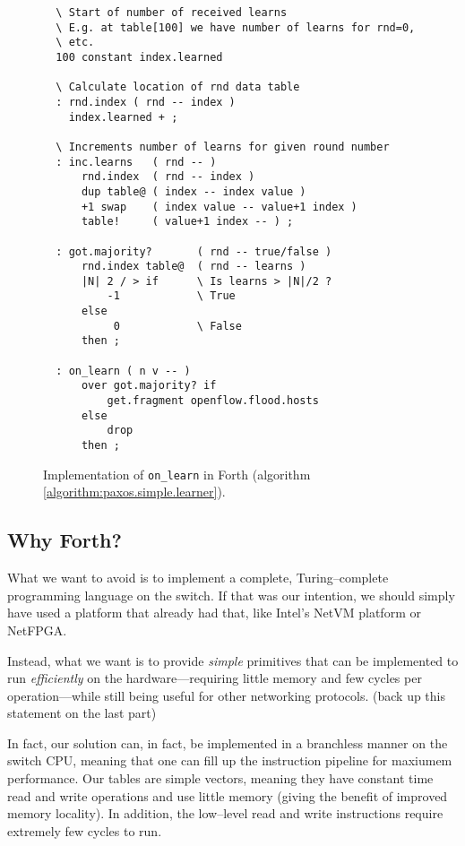 \begin{figure}[H]
  \centering
  \begin{Verbatim}
  \ Start of number of received learns
  \ E.g. at table[100] we have number of learns for rnd=0,
  \ etc.
  100 constant index.learned

  \ Calculate location of rnd data table
  : rnd.index ( rnd -- index )
    index.learned + ;

  \ Increments number of learns for given round number
  : inc.learns   ( rnd -- )
      rnd.index  ( rnd -- index )
      dup table@ ( index -- index value )
      +1 swap    ( index value -- value+1 index )
      table!     ( value+1 index -- ) ;

  : got.majority?       ( rnd -- true/false )
      rnd.index table@  ( rnd -- learns )
      |N| 2 / > if      \ Is learns > |N|/2 ?
          -1            \ True
      else
           0            \ False
      then ;

  : on_learn ( n v -- )
      over got.majority? if
          get.fragment openflow.flood.hosts
      else
          drop
      then ;
  \end{Verbatim}
  \caption{Implementation of \texttt{on\_{}learn} in Forth (algorithm \ref{algorithm:paxos.simple.learner}).}
  \label{program:forth.on-learn}
\end{figure}

\subsection{Why Forth?}


What we want to avoid is to implement a complete, Turing--complete
programming language on the switch.  If that was our intention, we should
simply have used a platform that already had that, like Intel's NetVM
platform or NetFPGA.

Instead, what we want is to provide \textit{simple} primitives that can be
implemented to run \textit{efficiently} on the hardware---requiring little
memory and few cycles per operation---while still being useful for other
networking protocols. (back up this statement on the last part)

In fact, our solution can, in fact, be implemented in a branchless manner on the
switch CPU, meaning that one can fill up the instruction pipeline for
maxiumem performance.  Our tables are simple vectors, meaning they
have constant time read and write operations and use little memory
(giving the benefit of improved memory locality).  In addition, the
low--level read and write instructions require extremely few cycles to run.

